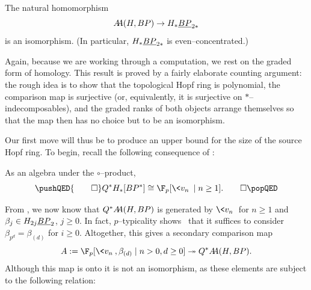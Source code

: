 \begin{theorem}\label{HFpBPCooperationsTheorem}
The natural homomorphism \[\AA(H, BP) \to H_* \OS{BP}{2*}\] is an isomorphism.
(In particular, \(H_* \OS{BP}{2*}\) is even--concentrated.)
\end{theorem}

\noindent Again, because we are working through a computation, we rest on the graded form of homology.
This result is proved by a fairly elaborate counting argument: the rough idea is to show that the topological Hopf ring is polynomial, the comparison map is surjective (or, equivalently, it is surjective on \(\ast\)--indecomposables), and the graded ranks of both objects arrange themselves so that the map then has no choice but to be an isomorphism.

Our first move will thus be to produce an upper bound for the size of the source Hopf ring.
To begin, recall the following consequence of :

\begin{corollary}
As an algebra under the \(\circ\)--product,
\[\pushQED{\qed}
Q^* H_*[BP^*] \cong \F_p[\<v_n\> \mid n \ge 1]. \qedhere
\popQED\]
\end{corollary}

\noindent From , we now know that \(Q^* \AA(H, BP)\) is generated by \(\<v_n\>\) for \(n \ge 1\) and \(\beta_j \in H_{2j} \OS{BP}{2}\), \(j \ge 0\).
In fact, \(p\)--typicality shows~\cite[Lemma 4.14]{RavenelWilsonHopfRingForMU} that it suffices to consider \(\beta_{p^d} = \beta_{(d)}\) for \(i \ge 0\).
Altogether, this gives a secondary comparison map \[A := \F_p[\<v_n\>, \beta_{(d)} \mid n > 0, d \ge 0] \onto Q^* \AA(H, BP).\]
Although this map is onto it is not an isomorphism, as these elements are subject to the following relation:


